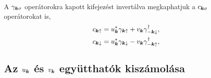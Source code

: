 \documentclass[a4paper,12pt,titlepage]{article}
\newcommand{\KK}{{\vb*{k}}}
\begin{document}
A $\gamma_{\KK \sigma}$ operátorokra kapott kifejezést invertálva megkaphatjuk a $c_{\KK \sigma}$ operátorokat is,
\begin{equation}
\begin{split}
	c_{\KK \uparrow} & = u_\KK^* \gamma_{\KK \uparrow} + v_\KK \gamma_{-\KK \downarrow}^\dagger, \\
	c_{\KK \downarrow} & = u_\KK^* \gamma_{\KK \downarrow} - v_\KK \gamma_{-\KK \uparrow}^\dagger, \\
\end{split}
\end{equation}


\subsection{Az $u_\KK$ és $v_\KK$ együtthatók kiszámolása}
\end{document}

